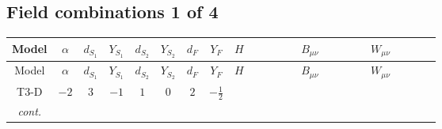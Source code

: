 \documentclass[8pt]{article}
\begin{document}
\begin{landscape}
\subsection*{Field combinations 1 of 4}
\begin{longtable}{@{}cccccccc >{\raggedright\arraybackslash}p{0.21\linewidth} >{\raggedright\arraybackslash}p{0.21\linewidth} >{\raggedright\arraybackslash}p{0.21\linewidth}@{}}
\toprule
Model & $\alpha$ & $d_{S_1}$ & $Y_{S_1}$ & $d_{S_2}$ & $Y_{S_2}$ & $d_F$ & $Y_F$ & $H$ & $B_{\mu\nu}$ & $W_{\mu\nu}$ \\
\midrule
\endfirsthead
\toprule
Model & $\alpha$ & $d_{S_1}$ & $Y_{S_1}$ & $d_{S_2}$ & $Y_{S_2}$ & $d_F$ & $Y_F$ & $H$ & $B_{\mu\nu}$ & $W_{\mu\nu}$ \\
\midrule
\endhead
T3-D & $-2$ & $3$ & $-1$ & $1$ & $0$ & $2$ & $-\frac{1}{2}$ & \scriptsize\adjustbox{max width=\linewidth}{$\begin{gathered} +C_{\text{H2}} H_{a_1} H_{a_1}{}^{\dagger } \\ -H_{a_1} \mu ^2 H_{a_1}{}^{\dagger } \\ +\frac{2 \hbar  \overline{\lambda_5} H_{a_1} H_{a_2} \lambda_5 H_{a_1}{}^{\dagger } H_{a_2}{}^{\dagger }}{\sqrt{3} \epsilon }\end{gathered}$} & \scriptsize\adjustbox{max width=\linewidth}{$\begin{gathered} -\frac{3 \hbar  B_{\mu _1\mu _2}^2}{4 \epsilon } \\ -\frac{1}{4} \hbar  \log \left(\frac{\bar{\mu}^{2}}{m_1^2}\right) B_{\mu _1\mu _2}^2\end{gathered}$} & \scriptsize\adjustbox{max width=\linewidth}{$\begin{gathered} -\frac{2 \hbar  \left(W_{\mu _1\mu _2}^{A_1}\right){}^2}{3 \epsilon } \\ -\frac{1}{6} \hbar  \log \left(\frac{\bar{\mu}^{2}}{m_1^2}\right) \left(W_{\mu _1\mu _2}^{A_1}\right){}^2\end{gathered}$} \\
\textit{cont.} &  &  &  &  &  &  &  & \scriptsize\adjustbox{max width=\linewidth}{$\begin{gathered} +\frac{2 \hbar  \overline{\lambda_5} H_{a_1} H_{a_2} m_1^2 \lambda_5 H_{a_1}{}^{\dagger } H_{a_2}{}^{\dagger }}{\sqrt{3} \left(m_1^2-m_2^2\right)} \\ +\frac{2 \hbar  \log \left(\frac{\bar{\mu}^{2}}{m_1^2}\right) \overline{\lambda_5} H_{a_1} H_{a_2} m_1^2 \lambda_5 H_{a_1}{}^{\dagger } H_{a_2}{}^{\dagger }}{\sqrt{3} \left(m_1^2-m_2^2\right)} \\ -\frac{2 \hbar  \overline{\lambda_5} H_{a_1} H_{a_2} m_2^2 \lambda_5 H_{a_1}{}^{\dagger } H_{a_2}{}^{\dagger }}{\sqrt{3} \left(m_1^2-m_2^2\right)}\end{gathered}$} &  &  \\

\end{longtable}
\end{landscape}
\end{document}
